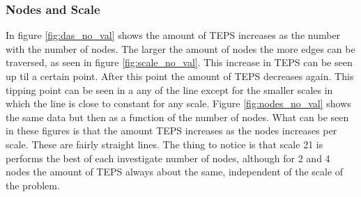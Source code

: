 \subsubsection{Nodes and Scale}
\label{res:nodes_scale}
In figure \ref{fig:das_no_val} shows the amount of TEPS increases as the number with the number of nodes. The larger the amount of nodes the more edges can be traversed, as seen in figure \ref{fig:scale_no_val}. This increase in TEPS can be seen up til a certain point. After this point the amount of TEPS decreases again. This tipping point can be seen in a any of the line except for the smaller scales in which the line is close to constant for any scale.
Figure \ref{fig:nodes_no_val} shows the same data but then as a function of the number of nodes. What can be seen in these figures is that the amount TEPS increases as the nodes increases per scale. These are fairly straight lines. The thing to notice is that scale 21 is performs the best of each investigate number of nodes, although for 2 and 4 nodes the amount of TEPS always about the same, independent of the scale of the problem. 

